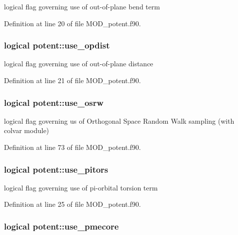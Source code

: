 logical flag governing use of out-\/of-\/plane bend term 



Definition at line 20 of file M\-O\-D\-\_\-potent.\-f90.

\hypertarget{classpotent_a73b391b2ac5c8ca035e989745c1d4778}{
\subsubsection[{use\-\_\-opdist}]{\setlength{\rightskip}{0pt plus 5cm}logical potent\-::use\-\_\-opdist}}\label{classpotent_a73b391b2ac5c8ca035e989745c1d4778}


logical flag governing use of out-\/of-\/plane distance 



Definition at line 21 of file M\-O\-D\-\_\-potent.\-f90.

\hypertarget{classpotent_a6ff9ada206ae29ab9d2dfa369165fbb9}{
\subsubsection[{use\-\_\-osrw}]{\setlength{\rightskip}{0pt plus 5cm}logical potent\-::use\-\_\-osrw}}\label{classpotent_a6ff9ada206ae29ab9d2dfa369165fbb9}


logical flag governing us of Orthogonal Space Random Walk sampling (with colvar module) 



Definition at line 73 of file M\-O\-D\-\_\-potent.\-f90.

\hypertarget{classpotent_add03f56b6452a9d6109285d8b9c41baa}{
\subsubsection[{use\-\_\-pitors}]{\setlength{\rightskip}{0pt plus 5cm}logical potent\-::use\-\_\-pitors}}\label{classpotent_add03f56b6452a9d6109285d8b9c41baa}


logical flag governing use of pi-\/orbital torsion term 



Definition at line 25 of file M\-O\-D\-\_\-potent.\-f90.

\hypertarget{classpotent_a43e7f1f94b7cf392cd75a697c69136c0}{
\subsubsection[{use\-\_\-pmecore}]{\setlength{\rightskip}{0pt plus 5cm}logical potent\-::use\-\_\-pmecore}}\label{classpotent_a43e7f1f94b7cf392cd75a697c69136c0}


